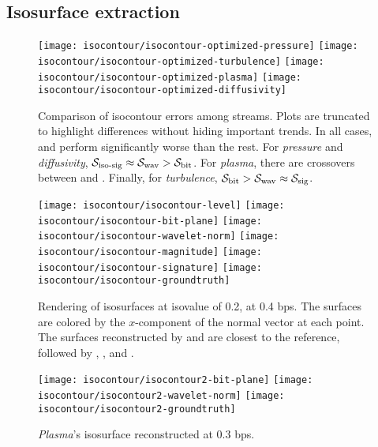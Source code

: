 \subsection{Isosurface extraction}\label{sec:isocontour}

\begin{figure*}[h]
\centering
{}
{\texttt{[image: isocontour/isocontour-optimized-pressure]}}
{\texttt{[image: isocontour/isocontour-optimized-turbulence]}}
{\texttt{[image: isocontour/isocontour-optimized-plasma]}}
{\texttt{[image: isocontour/isocontour-optimized-diffusivity]}}
\caption{Comparison of isocontour errors among streams. Plots are truncated to
highlight differences without hiding important trends. In all cases, \slvl and
\smag perform significantly worse than the rest. For \emph{pressure} and
\emph{diffusivity}, $\sisg \approx \swav > \sbit$. For \emph{plasma}, there are
crossovers between \sbit and \swav. Finally, for \emph{turbulence}, $\sbit >
\swav \approx \ssig$.} \label{fig:isocontour-plots}
\vspace{1em}

\centering
{}
{\texttt{[image: isocontour/isocontour-level]}}
{\texttt{[image: isocontour/isocontour-bit-plane]}}
{\texttt{[image: isocontour/isocontour-wavelet-norm]}}
{\texttt{[image: isocontour/isocontour-magnitude]}}
{\texttt{[image: isocontour/isocontour-signature]}}
{\texttt{[image: isocontour/isocontour-groundtruth]}}
\caption{Rendering of isosurfaces at isovalue of 0.2, at 0.4 bps. The surfaces
are colored by the $x$-component of the normal vector at each point. The
surfaces reconstructed by \swav and \sisg are closest to the reference,
followed by \sbit, \smag, and \slvl.} \label{fig:isocontour-surfaces-pressure}
\end{figure*}

\begin{figure}[h]
\centering
{}
{\texttt{[image: isocontour/isocontour2-bit-plane]}}
{\texttt{[image: isocontour/isocontour2-wavelet-norm]}}
{\texttt{[image: isocontour/isocontour2-groundtruth]}}
\caption{\emph{Plasma}'s isosurface reconstructed at 0.3 bps.}
\label{fig:isocontour-surfaces-plasma}
\end{figure}

